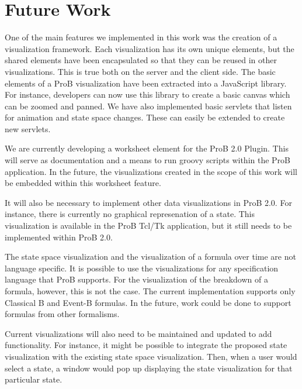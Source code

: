 \section{Future Work}

One of the main features we implemented in this work was the creation of a visualization framework. Each visualization has its own unique elements, but the shared elements have been encapsulated so that they can be reused in other visualizations. This is true both on the server and the client side. The basic elements of a ProB visualization have been extracted into a JavaScript library. For instance, developers can now use this library to create a basic canvas which can be zoomed and panned. We have also implemented basic servlets that listen for animation and state space changes. These can easily be extended to create new servlets.

We are currently developing a worksheet element for the ProB 2.0 Plugin. This will serve as documentation and a means to run groovy scripts within the ProB application. In the future, the visualizations created in the scope of this work will be embedded within this worksheet feature. 

It will also be necessary to implement other data visualizations in ProB 2.0. For instance, there is currently no graphical represenation of a state. This visualization is available in the ProB Tcl/Tk application, but it still needs to be implemented within ProB 2.0.

The state space visualization and the visualization of a formula over time are not language specific. It is possible to use the visualizations for any specification language that ProB supports. For the visualization of the breakdown of a formula, however, this is not the case. The current implementation supports only Classical B and Event-B formulas. In the future, work could be done to support formulas from other formalisms.

Current visualizations will also need to be maintained and updated to add functionality. For instance, it might be possible to integrate the proposed state visualization with the existing state space visualization. Then, when a user would select a state, a window would pop up displaying the state visualization for that particular state.